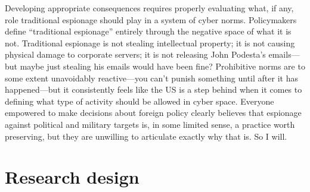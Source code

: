 \documentclass{memoir}
\begin{document}
\begin{refsegment}
Developing appropriate consequences requires properly evaluating what, if any, role traditional espionage should play in a system of cyber norms. Policymakers define ``traditional espionage'' entirely through the negative space of what it is not. Traditional espionage is not stealing intellectual property; it is not causing physical damage to corporate servers; it is not releasing John Podesta's emails---but maybe just stealing his emails would have been fine? Prohibitive norms are to some extent unavoidably reactive---you can't punish something until after it has happened---but it consistently feels like the US is a step behind when it comes to defining what type of activity should be allowed in cyber space. Everyone empowered to make decisions about foreign policy clearly believes that espionage against political and military targets is, in some limited sense, a practice worth preserving, but they are unwilling to articulate exactly why that is. So I will.



\section{Research design}

\end{refsegment}
\end{document}
